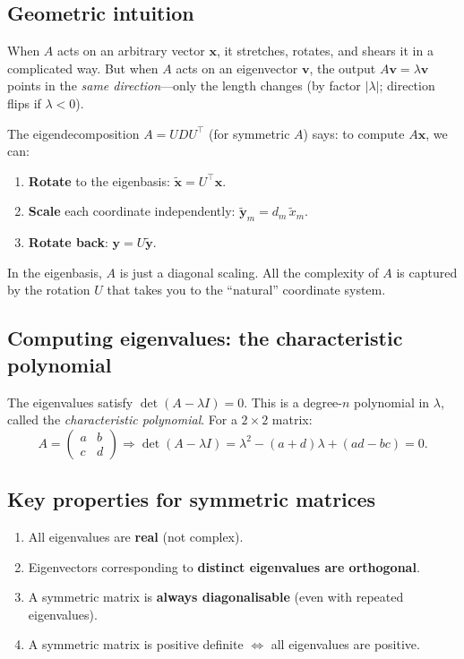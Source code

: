 \documentclass[11pt,a4paper]{article}
\begin{document}
\subsection{Geometric intuition}

When $A$ acts on an arbitrary vector $\mathbf{x}$, it stretches, rotates, and shears it in a complicated way.  But when $A$ acts on an eigenvector $\mathbf{v}$, the output $A\mathbf{v} = \lambda\mathbf{v}$ points in the \emph{same direction}---only the length changes (by factor $|\lambda|$; direction flips if $\lambda < 0$).

The eigendecomposition $A = UDU^\top$ (for symmetric $A$) says: to compute $A\mathbf{x}$, we can:
\begin{enumerate}[nosep]
  \item \textbf{Rotate} to the eigenbasis: $\tilde{\mathbf{x}} = U^\top\mathbf{x}$.
  \item \textbf{Scale} each coordinate independently: $\tilde{\mathbf{y}}_m = d_m\,\tilde{x}_m$.
  \item \textbf{Rotate back}: $\mathbf{y} = U\tilde{\mathbf{y}}$.
\end{enumerate}
In the eigenbasis, $A$ is just a diagonal scaling.  All the complexity of $A$ is captured by the rotation $U$ that takes you to the ``natural'' coordinate system.

\subsection{Computing eigenvalues: the characteristic polynomial}

The eigenvalues satisfy $\det(A - \lambda I) = 0$.  This is a degree-$n$ polynomial in $\lambda$, called the \emph{characteristic polynomial}.  For a $2 \times 2$ matrix:
\begin{equation}
  A = \begin{pmatrix} a & b \\ c & d \end{pmatrix} \Rightarrow \det(A - \lambda I) = \lambda^2 - (a+d)\lambda + (ad - bc) = 0.
\end{equation}

\subsection{Key properties for symmetric matrices}

\begin{enumerate}[nosep]
  \item All eigenvalues are \textbf{real} (not complex).
  \item Eigenvectors corresponding to \textbf{distinct eigenvalues are orthogonal}.
  \item A symmetric matrix is \textbf{always diagonalisable} (even with repeated eigenvalues).
  \item A symmetric matrix is positive definite $\iff$ all eigenvalues are positive.
\end{enumerate}
\end{document}
